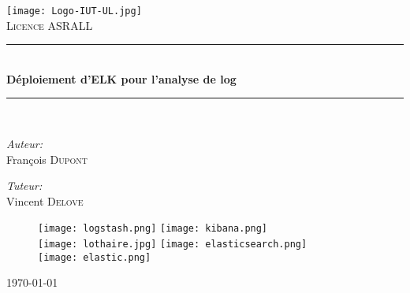 \begin{titlepage}
\begin{center}
 \newcommand{\HRule}{\rule{\linewidth}{0.5mm}}

\texttt{[image: Logo-IUT-UL.jpg]}\\[1cm]


\textsc{\LARGE Licence ASRALL}\\[0.5cm]

\HRule \\[0.4cm]
{ \Large \bfseries Déploiement d'ELK pour l'analyse de log\\[0.4cm] }

\HRule \\[1.5cm]

\noindent
\begin{minipage}{0.5\textwidth}
\begin{flushleft} \large
\emph{Auteur:}\\
François \textsc{Dupont}\\
\end{flushleft}
\end{minipage}%
\begin{minipage}{0.5\textwidth}
\begin{flushright} \large
\emph{Tuteur:} \\
Vincent \textsc{Delove}
\end{flushright}
\end{minipage}

%

\vfill

\begin{figure}[h]
    \centering
    \texttt{[image: logstash.png]}
    \hfill
    \texttt{[image: kibana.png]}
    \\[0.2cm]
    \texttt{[image: lothaire.jpg]}
    \hfill
    \texttt{[image: elasticsearch.png]}
    \\
    \texttt{[image: elastic.png]}
\end{figure}

\vfill
{\today}%

\end{center}
\end{titlepage}
